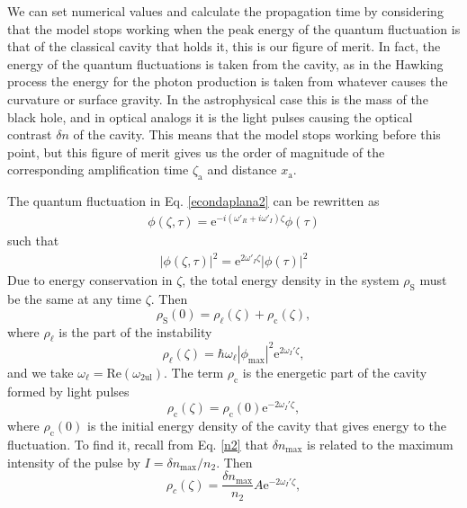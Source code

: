 \documentclass[aps,pra,reprint,amsmath,amssymb,showpacs,groupedaddress,floatfix]{revtex4-1}
\begin{document}
We can set numerical values and calculate the propagation time by considering that the model stops working when the peak energy of the quantum fluctuation is that of the classical cavity that holds it, this is our figure of merit. In fact, the energy of the quantum fluctuations is taken from the cavity, as in the Hawking process the energy for the photon production is taken from whatever causes the curvature or surface gravity. In the astrophysical case this is the mass of the black hole, and in optical analogs it is the light pulses causing the optical contrast $\delta n$ of the cavity. This means that the model stops working before this point, but this figure of merit gives us the order of magnitude of the corresponding amplification time $\zeta_\text{a}$ and distance $x_\text{a}$.

The quantum fluctuation in Eq. \eqref{econdaplana2} can be rewritten as
\begin{align}
\phi(\zeta,\tau)=\text{e}^{-i(\omega'_R+i\omega'_I)\zeta}\phi(\tau)
\end{align}
such that
\begin{align}
|\phi(\zeta,\tau)|^2=\text{e}^{2\omega'_I\zeta}|\phi(\tau)|^2
\end{align}
Due to energy conservation in $\zeta$, the total energy density in the system $\rho_\text{S}$ must be the same at any time $\zeta$. Then
\begin{equation}\label{aa}
\rho_{\text{S}}(0)=\rho_\ell(\zeta)+\rho_\text{c}(\zeta),
\end{equation}
where $\rho_\ell$ is the part of the instability
\begin{equation}\label{bb}
\rho_\ell(\zeta)=\hbar \omega_\ell|\phi_{\text{max}}|^2\text{e}^{2\omega_I'\zeta},
\end{equation}
and we take $\omega_\ell=\text{Re}(\omega_\text{2ul})$. The term $\rho_\text{c}$ is the energetic part of the cavity formed by light pulses
\begin{equation}\label{cc}
\rho_\text{c}(\zeta) =\rho_\text{c}(0)\text{e}^{-2\omega_{I}'\zeta},
\end{equation}
where $\rho_\text{c}(0)$ is the initial energy density of the cavity that gives energy to the fluctuation. To find it, recall from Eq. \eqref{n2} that $\delta n_\text{max}$ is related to the maximum intensity of the pulse by $I=\delta n_\text{max}/n_2$. Then
\begin{equation}\label{ee}
\rho_c(\zeta)=\frac{\delta n_{\text{max}}}{n_2}A\text{e}^{-2\omega_{I}'\zeta},
\end{equation}
\end{document}
